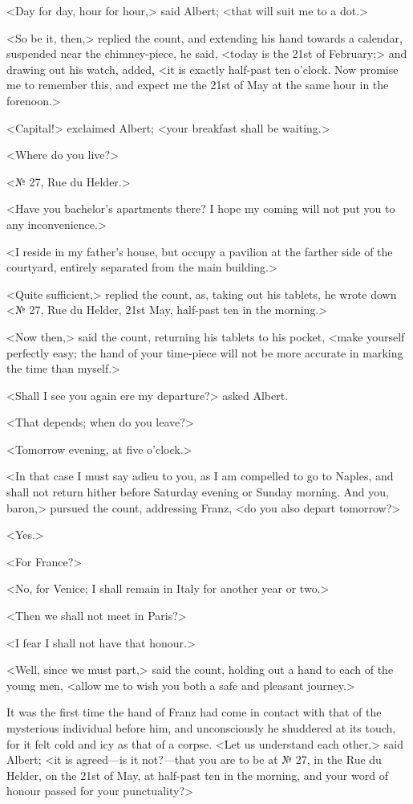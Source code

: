  <Day for day, hour for hour,> said Albert; <that will suit me to a dot.> 

 <So be it, then,> replied the count, and extending his hand towards a calendar, suspended near the chimney-piece, he said, <today is the 21st of February;> and drawing out his watch, added, <it is exactly half-past ten o'clock. Now promise me to remember this, and expect me the 21st of May at the same hour in the forenoon.> 

 <Capital!> exclaimed Albert; <your breakfast shall be waiting.> 

 <Where do you live?> 

 <№ 27, Rue du Helder.> 

 <Have you bachelor's apartments there? I hope my coming will not put you to any inconvenience.> 

 <I reside in my father's house, but occupy a pavilion at the farther side of the courtyard, entirely separated from the main building.> 

 <Quite sufficient,> replied the count, as, taking out his tablets, he wrote down <№ 27, Rue du Helder, 21st May, half-past ten in the morning.> 

 <Now then,> said the count, returning his tablets to his pocket, <make yourself perfectly easy; the hand of your time-piece will not be more accurate in marking the time than myself.> 

 <Shall I see you again ere my departure?> asked Albert. 

 <That depends; when do you leave?> 

 <Tomorrow evening, at five o'clock.> 

 <In that case I must say adieu to you, as I am compelled to go to Naples, and shall not return hither before Saturday evening or Sunday morning. And you, baron,> pursued the count, addressing Franz, <do you also depart tomorrow?> 

 <Yes.> 

 <For France?> 

 <No, for Venice; I shall remain in Italy for another year or two.> 

 <Then we shall not meet in Paris?> 

 <I fear I shall not have that honour.> 

 <Well, since we must part,> said the count, holding out a hand to each of the young men, <allow me to wish you both a safe and pleasant journey.> 

 It was the first time the hand of Franz had come in contact with that of the mysterious individual before him, and unconsciously he shuddered at its touch, for it felt cold and icy as that of a corpse.  <Let us understand each other,> said Albert; <it is agreed—is it not?—that you are to be at № 27, in the Rue du Helder, on the 21st of May, at half-past ten in the morning, and your word of honour passed for your punctuality?> 


